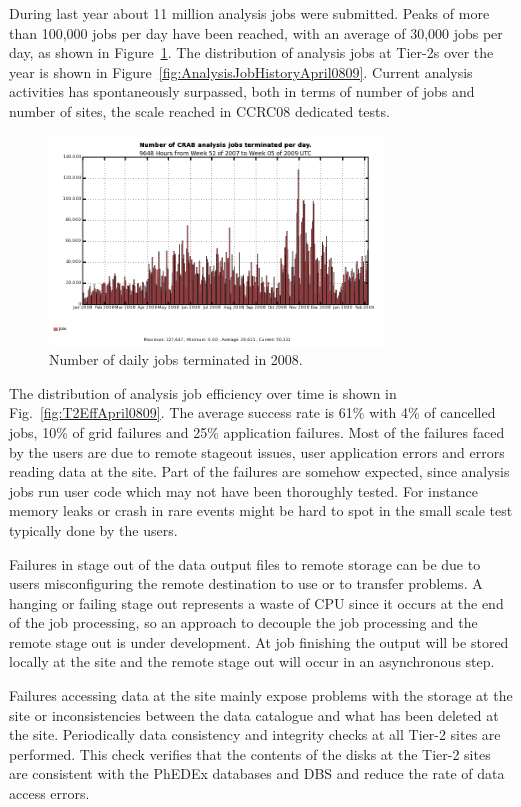 During last year about 11 million analysis jobs were submitted.  Peaks
of more than 100,000 jobs per day have been reached, with an average
of 30,000 jobs per day, as shown in Figure~\ref{fig:jobs}.
The distribution of analysis jobs at Tier-2s over the year is shown in Figure~\ref{fig:AnalysisJobHistoryApril0809}. Current analysis activities has spontaneously surpassed, both in terms of number of jobs and number of sites, the scale reached in CCRC08 dedicated tests. 
\begin{figure}
\includegraphics[width=3.5in]{figures/crabjobsdaily.png}
\caption{Number of daily jobs terminated in 2008. }
\label{fig:jobs}
\end{figure}

The distribution of analysis job efficiency over time is shown in Fig.~\ref{fig:T2EffApril0809}. The average success rate is 61\% with 4\% of cancelled jobs, 10\% of grid failures and 25\% application failures.
Most of the failures faced by the users are due to remote stageout issues, user application errors and errors reading data at the site. 
Part of the failures are somehow expected, since analysis jobs run user code which may not have been thoroughly tested. For instance memory leaks or crash in rare events might be hard to spot in the small scale test typically done by the users.

Failures in stage out of the data output files to remote storage can be due 
to users misconfiguring the remote destination to use or to transfer problems.
A hanging or failing stage out represents a waste of CPU since it occurs at 
the end of the job processing, so an approach to decouple the job processing and the remote stage out is under development. At job finishing the output will be stored locally at the site and the remote stage out will occur in an asynchronous step.

Failures accessing data at the site mainly expose problems with the storage at the site or inconsistencies between the data catalogue and what has been deleted at the site. 
Periodically data consistency and integrity checks at all Tier-2 sites are performed. This check verifies that the contents of the disks at the Tier-2 sites are consistent with the PhEDEx databases and DBS and reduce the rate of data access errors.


